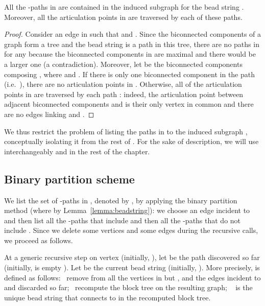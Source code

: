 \begin{lemma}
  \label{lemma:beadstring}
  All the -paths in  are contained in the
  induced subgraph  for the bead string
  . Moreover, all the articulation points in
   are traversed by each of these paths.
\end{lemma}
\begin{proof}
  Consider an edge  in  such that 
  and . Since the biconnected components of a
  graph form a tree and the bead string  is a path in
  this tree, there are no paths  in  for any  because the biconnected components in  are maximal
  and there would be a larger one (a contradiction).
Moreover, let  be the biconnected components
  composing , where  and . If
  there is only one biconnected component in the path (i.e.~),
  there are no articulation points in .  Otherwise, all
  of the  articulation points in  are traversed by
  each path : indeed, the articulation
  point between adjacent biconnected components  and  is
  their only vertex in common and there are no edges linking  and
  .
\end{proof}

We thus restrict the problem of listing the paths in
 to the induced subgraph ,
conceptually isolating it from the rest of . For the sake of
description, we will use interchangeably  and
 in the rest of the chapter.

\subsection{Binary partition scheme}
\label{sec:basic-scheme}

We list the set of -paths in , denoted by
, by applying the binary partition
method (where 
by Lemma~\ref{lemma:beadstring}): we choose an edge 
incident to~ and then list all the -paths that include  and
then all the -paths that do not include . Since we delete some
vertices and some edges during the recursive calls, we proceed as follows.

\smallskip

 At a generic recursive step on vertex 
(initially, ), let  be the path discovered
so far (initially,  is empty ). Let  be the
current bead string (initially, ). More precisely,  is defined as follows:
~remove from  all the vertices in  but , and
the edges incident to  and discarded so far; ~recompute the
block tree on the resulting graph; ~ is the unique
bead string that connects  to  in the recomputed block tree.

\smallskip

